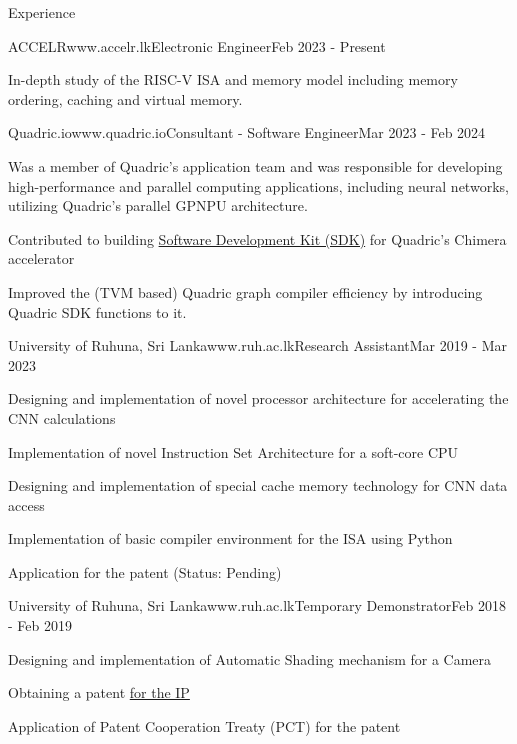\documentclass[
	11pt, %
]{./../assets/resume} %
\begin{document}
\begin{rSection}{Experience}

	\begin{rSubsectionX}{ACCELR}{www.accelr.lk}{Electronic Engineer}{Feb 2023 - Present}
		\item In-depth study of the RISC-V ISA and memory model including memory ordering, caching and virtual memory.
	\end{rSubsectionX}

	\begin{rSubsectionX}{Quadric.io}{www.quadric.io}{Consultant - Software Engineer}{Mar 2023 - Feb 2024}
        \item Was a member of Quadric's application team and was responsible for developing high-performance and parallel computing applications, including neural networks, utilizing Quadric's parallel GPNPU architecture.
        \item Contributed to building \href{https://quadric.io/sdk/}{Software Development Kit (SDK)} for Quadric's Chimera accelerator
        \item Improved the (TVM based) Quadric graph compiler efficiency by introducing Quadric SDK functions to it.
    \end{rSubsectionX}

	\begin{rSubsectionX}{University of Ruhuna, Sri Lanka}{www.ruh.ac.lk}{Research Assistant}{Mar 2019 - Mar 2023}
		\item Designing and implementation of novel processor architecture for accelerating the CNN calculations
		\item Implementation of novel Instruction Set Architecture for a soft-core CPU
		\item Designing and implementation of special cache memory technology for CNN data access
		\item Implementation of basic compiler environment for the ISA using Python
		\item Application for the patent (Status: Pending)
	\end{rSubsectionX}


	\begin{rSubsectionX}{University of Ruhuna, Sri Lanka}{www.ruh.ac.lk}{Temporary Demonstrator}{Feb 2018 - Feb 2019}
		\item Designing and implementation of Automatic Shading mechanism for a Camera
		\item Obtaining a patent \href{https://patentscope.wipo.int/search/en/detail.jsf?docId=WO2021069993&_cid=P20-LSKB9J-42754-1}{for the IP}
		\item Application of Patent Cooperation Treaty (PCT) for the patent 
	\end{rSubsectionX}

\end{rSection}
\end{document}
